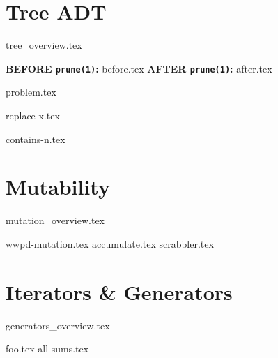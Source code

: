 \documentclass{exam}
\begin{document}
\section{Tree ADT}
{tree_overview.tex}
\begin{questions}
    \newpage
     \begin{blocksection}
        \textbf{BEFORE \lstinline{prune(1)}:}
        {before.tex}
        \hspace{0.5in}
        \textbf{AFTER \lstinline{prune(1)}:}
        {after.tex}
    \end{blocksection}
        
    
        {problem.tex}
    
        {replace-x.tex}

        {contains-n.tex}
\end{questions}

\newpage

\section{Mutability}
{mutation_overview.tex}
	\begin{questions}
	    {wwpd-mutation.tex}
        {accumulate.tex}
        \newpage
        {scrabbler.tex}
\end{questions}

\newpage
\section{Iterators \& Generators}
{generators_overview.tex}
\begin{questions}
    {foo.tex}
    {all-sums.tex}
\end{questions}
\end{document}
